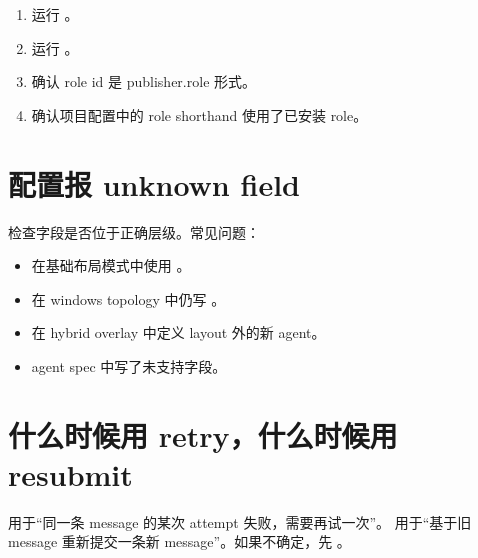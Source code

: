 \begin{enumerate}
  \item 运行 。
  \item 运行 。
  \item 确认 role id 是 publisher.role 形式。
  \item 确认项目配置中的 role shorthand 使用了已安装 role。
\end{enumerate}

\section{配置报 unknown field}

检查字段是否位于正确层级。常见问题：

\begin{itemize}
  \item 在基础布局模式中使用 。
  \item 在 windows topology 中仍写 。
  \item 在 hybrid overlay 中定义 layout 外的新 agent。
  \item agent spec 中写了未支持字段。
\end{itemize}

\section{什么时候用 retry，什么时候用 resubmit}

 用于“同一条 message 的某次 attempt 失败，需要再试一次”。 用于“基于旧 message 重新提交一条新 message”。如果不确定，先 。
